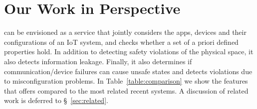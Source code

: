 
\section{Our Work in Perspective} \sys can be envisioned as a service 
that jointly considers the apps, devices and their configurations of an IoT system, and checks whether a set of a priori defined properties hold. In addition to detecting safety violations of the physical space, it also detects information leakage. {\color{black}
Finally, it also determines if communication/device failures can cause unsafe states and detects violations due to misconfiguration problems}. In Table~\ref{table:comparison} we show the features that
\sys offers compared to the most related recent systems. A discussion of related work is deferred to \S~\ref{sec:related}.
